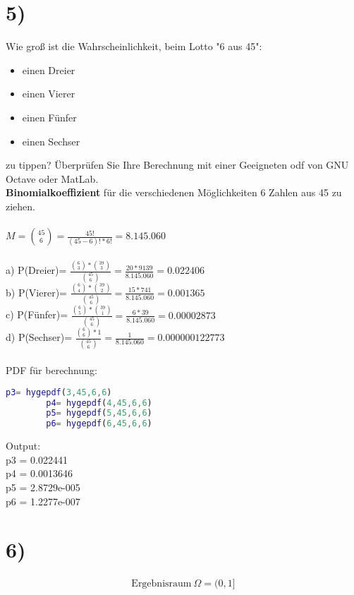 	\section*{5)}
	Wie groß ist die Wahrscheinlichkeit, beim Lotto "6 aus 45":
	\begin{itemize}
		\item einen Dreier
		\item einen Vierer
		\item einen Fünfer
		\item einen Sechser
	\end{itemize}
	zu tippen? Überprüfen Sie Ihre Berechnung mit einer Geeigneten odf von GNU Octave oder MatLab.\\

	\textbf{Binomialkoeffizient} für die verschiedenen Möglichkeiten 6 Zahlen aus 45 zu ziehen.\\\\
	\(M=\binom{45}{6} =\frac{45!}{(45-6)! * 6!}= 8.145.060\)\\\\
	a) P(Dreier)= \( \frac{\binom{6}{3} * \binom{39}{3}}{\binom{45}{6}}=\frac{20*9139}{8.145.060}=0.022406\)\\
	b) P(Vierer)= \( \frac{\binom{6}{4} * \binom{39}{2}}{\binom{45}{6}}=\frac{15*741}{8.145.060}=0.001365\)\\
	c) P(Fünfer)= \( \frac{\binom{6}{5} * \binom{39}{1}}{\binom{45}{6}}=\frac{6*39}{8.145.060}=0.00002873\)\\
	d) P(Sechser)= \( \frac{\binom{6}{6} * 1}{\binom{45}{6}}=\frac{1}{8.145.060}=0.000000122773\)\\\\
	PDF für berechnung:\\
	\begin{lstlisting}[language=MatLab,frame=single]
		p3= hygepdf(3,45,6,6)
		p4= hygepdf(4,45,6,6)
		p5= hygepdf(5,45,6,6)
		p6= hygepdf(6,45,6,6)
	\end{lstlisting}
	Output:\\
	p3 =  0.022441\\
	p4 =  0.0013646\\
	p5 =   2.8729e-005\\
	p6 =   1.2277e-007\\

	\newpage
	\section*{6)}

  \begin{align*}
    \text{Ergebnisraum}\ \Omega = (0,1]
  \end{align*}

